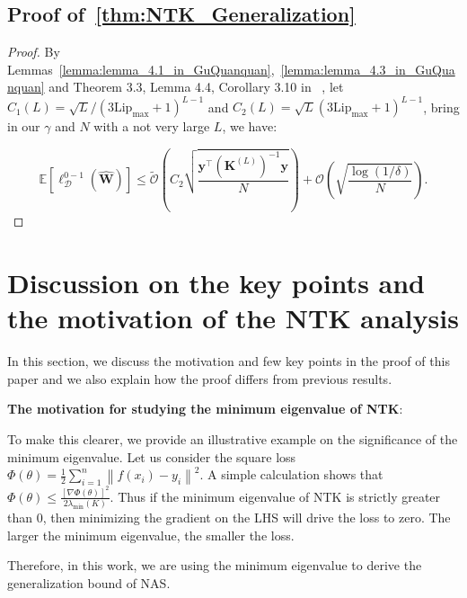 \documentclass[nohyperref]{article}
\theoremstyle{plain}
\theoremstyle{definition}
\theoremstyle{remark}
\begin{document}
\subsection{Proof of~\cref{thm:NTK_Generalization}}
\label{ssec:Proof_of_NTK_Generalization}

\begin{proof}

By Lemmas~\ref{lemma:lemma_4.1_in_GuQuanquan},~\cref{lemma:lemma_4.3_in_GuQuanquan} and Theorem 3.3, Lemma 4.4, Corollary 3.10 in ~\citep{cao2019generalization}, let $C_1(L) = \sqrt{L}/(3\mathrm{Lip}_{\max}+1)^{L-1}$ and $C_2(L) = \sqrt{L}(3\mathrm{Lip}_{\max}+1)^{L-1}$, bring in our $\gamma$ and $N$ with a not very large $L$, we have:

\begin{equation*}
\mathbb{E}[\ell_{\mathcal{D} }^{0-\!1}\!(\hat{\bm{W}}\!)] \!\leq\! \tilde{\mathcal{O} }\! \left(\! C_2\sqrt{\frac{\bm{y}^{\top}  ({\bm{K}^{(L)}})^{-1} \bm{y}}{N}} \!\right) + \mathcal{O}\!\left( \! \sqrt{\frac{\log(1/\delta )}{N} } \! \right)\!.
\end{equation*}




\end{proof}


\section{Discussion on the key points and the motivation of the NTK analysis}
\label{sec:discussion}


In this section, we discuss the motivation and few key points in the proof of this paper and we also explain how the proof differs from previous results.

\textbf{The motivation for studying the minimum eigenvalue of NTK}:

To make this clearer, we provide an illustrative example on the significance of the minimum eigenvalue. Let us consider the square loss $\Phi(\theta) = \frac{1}{2}\sum_{i=1}^{n} \left \| f(x_i) - y_i \right \|^2$. A simple calculation shows that $\Phi(\theta) \leq \frac{[\nabla \Phi(\theta)]^2}{2\lambda_{\min}(K)}$. Thus if the minimum eigenvalue of NTK is strictly greater than 0, then minimizing the gradient on the LHS will drive the loss to zero. The larger the minimum eigenvalue, the smaller the loss.

Therefore, in this work, we are using the minimum eigenvalue to derive the generalization bound of NAS. 
\end{document}

